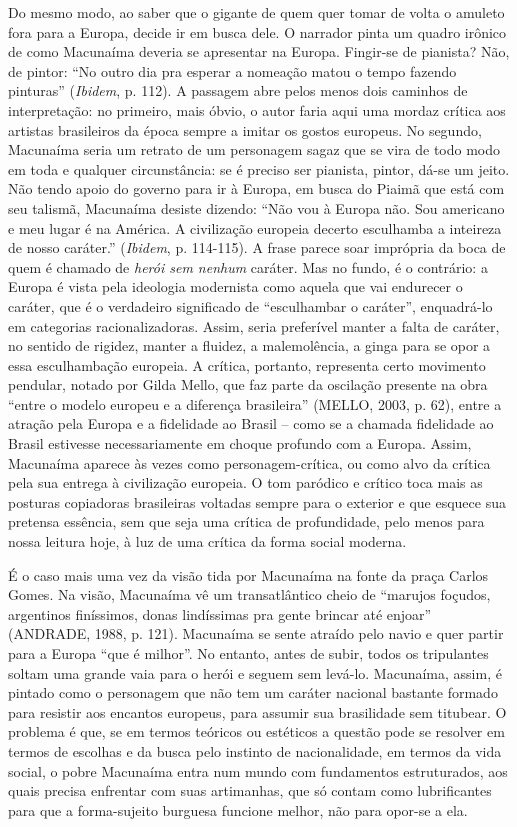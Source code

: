 Do mesmo modo, ao saber que o gigante de quem quer tomar de volta o
amuleto fora para a Europa, decide ir em busca dele. O narrador pinta um
quadro irônico de como Macunaíma deveria se apresentar na Europa.
Fingir-se de pianista? Não, de pintor: ``No outro dia pra esperar a
nomeação matou o tempo fazendo pinturas'' (\emph{Ibidem}, p. 112). A
passagem abre pelos menos dois caminhos de interpretação: no primeiro,
mais óbvio, o autor faria aqui uma mordaz crítica aos artistas
brasileiros da época sempre a imitar os gostos europeus. No segundo,
Macunaíma seria um retrato de um personagem sagaz que se vira de todo
modo em toda e qualquer circunstância: se é preciso ser pianista,
pintor, dá-se um jeito. Não tendo apoio do governo para ir à Europa, em
busca do Piaimã que está com seu talismã, Macunaíma desiste dizendo:
``Não vou à Europa não. Sou americano e meu lugar é na América. A
civilização europeia decerto esculhamba a inteireza de nosso caráter.''
(\emph{Ibidem}, p. 114-115). A frase parece soar imprópria da boca de
quem é chamado de \emph{herói sem nenhum} caráter. Mas no fundo, é o
contrário: a Europa é vista pela ideologia modernista como aquela que
vai endurecer o caráter, que é o verdadeiro significado de ``esculhambar
o caráter'', enquadrá-lo em categorias racionalizadoras. Assim, seria
preferível manter a falta de caráter, no sentido de rigidez, manter a
fluidez, a malemolência, a ginga para se opor a essa esculhambação
europeia. A crítica, portanto, representa certo movimento pendular,
notado por Gilda Mello, que faz parte da oscilação presente na obra
``entre o modelo europeu e a diferença brasileira'' (MELLO, 2003, p.
62), entre a atração pela Europa e a fidelidade ao Brasil -- como se a
chamada fidelidade ao Brasil estivesse necessariamente em choque
profundo com a Europa. Assim, Macunaíma aparece às vezes como
personagem-crítica, ou como alvo da crítica pela sua entrega à
civilização europeia. O tom paródico e crítico toca mais as posturas
copiadoras brasileiras voltadas sempre para o exterior e que esquece sua
pretensa essência, sem que seja uma crítica de profundidade, pelo menos
para nossa leitura hoje, à luz de uma crítica da forma social moderna.

É o caso mais uma vez da visão tida por Macunaíma na fonte da praça
Carlos Gomes. Na visão, Macunaíma vê um transatlântico cheio de
``marujos foçudos, argentinos finíssimos, donas lindíssimas pra gente
brincar até enjoar'' (ANDRADE, 1988, p. 121). Macunaíma se sente atraído
pelo navio e quer partir para a Europa ``que é milhor''. No entanto,
antes de subir, todos os tripulantes soltam uma grande vaia para o herói
e seguem sem levá-lo. Macunaíma, assim, é pintado como o personagem que
não tem um caráter nacional bastante formado para resistir aos encantos
europeus, para assumir sua brasilidade sem titubear. O problema é que,
se em termos teóricos ou estéticos a questão pode se resolver em termos
de escolhas e da busca pelo instinto de nacionalidade, em termos da vida
social, o pobre Macunaíma entra num mundo com fundamentos estruturados,
aos quais precisa enfrentar com suas artimanhas, que só contam como
lubrificantes para que a forma-sujeito burguesa funcione melhor, não
para opor-se a ela.

